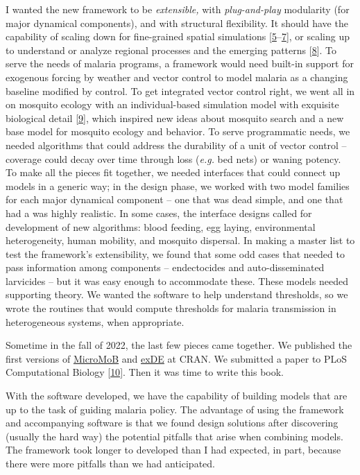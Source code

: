 \documentclass[
]{book}
\begin{document}
I wanted the new framework to be \emph{extensible,} with \emph{plug-and-play} modularity (for major dynamical components), and with structural flexibility. It should have the capability of scaling down for fine-grained spatial simulations {[}\protect\hyperlink{ref-CarterR2002SpatialSimulation}{5}--\protect\hyperlink{ref-PerkinsTA2013HeterogeneityMixing}{7}{]}, or scaling up to understand or analyze regional processes and the emerging patterns {[}\protect\hyperlink{ref-TatemAJ2010InternationalPopulation}{8}{]}. To serve the needs of malaria programs, a framework would need built-in support for exogenous forcing by weather and vector control to model malaria as a changing baseline modified by control. To get integrated vector control right, we went all in on mosquito ecology with an individual-based simulation model with exquisite biological detail {[}\protect\hyperlink{ref-WuSL2020MBITES}{9}{]}, which inspired new ideas about mosquito search and a new base model for mosquito ecology and behavior. To serve programmatic needs, we needed algorithms that could address the durability of a unit of vector control -- coverage could decay over time through loss (\emph{e.g.} bed nets) or waning potency. To make all the pieces fit together, we needed interfaces that could connect up models in a generic way; in the design phase, we worked with two model families for each major dynamical component -- one that was dead simple, and one that had a was highly realistic. In some cases, the interface designs called for development of new algorithms: blood feeding, egg laying, environmental heterogeneity, human mobility, and mosquito dispersal. In making a master list to test the framework's extensibility, we found that some odd cases that needed to pass information among components -- endectocides and auto-disseminated larvicides -- but it was easy enough to accommodate these. These models needed supporting theory. We wanted the software to help understand thresholds, so we wrote the routines that would compute thresholds for malaria transmission in heterogeneous systems, when appropriate.

Sometime in the fall of 2022, the last few pieces came together. We published the first versions of \href{https://cran.r-project.org/package=MicroMoB}{MicroMoB} and \href{https://CRAN.R-project.org/package=exDE}{exDE} at CRAN. We submitted a paper to PLoS Computational Biology {[}\protect\hyperlink{ref-WuSL2022SpatialDynamics}{10}{]}. Then it was time to write this book.

With the software developed, we have the capability of building models that are up to the task of guiding malaria policy. The advantage of using the framework and accompanying software is that we found design solutions after discovering (usually the hard way) the potential pitfalls that arise when combining models. The framework took longer to developed than I had expected, in part, because there were more pitfalls than we had anticipated.
\end{document}
